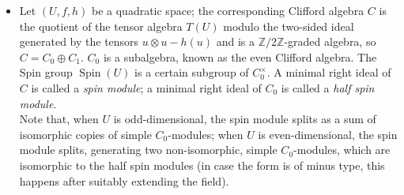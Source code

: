 \documentclass{amsart}
\numberwithin{equation}{section}
\theoremstyle{definition}
\theoremstyle{subresult}
\theoremstyle{caseresult}
\newcommand{\bF}{\mathbb{F}}
\newcommand{\bZ}{\mathbb{Z}}
\newcommand{\Aut}{\operatorname{Aut}}
\newcommand{\Sym}{\operatorname{Sym}}
\newcommand{\Spin}{\operatorname{Spin}}
\newcommand{\<}{\langle}
\renewcommand{\>}{\rangle}
\begin{document}
\begin{itemize}
		\item Let $(U,f,h)$ be a quadratic space; the corresponding Clifford algebra $C$ is the quotient of the tensor algebra $T(U)$ modulo the two-sided ideal generated by the tensors $u \otimes u - h(u)$ and is a $\bZ / 2\bZ$-graded algebra, so $C = C_0 \oplus C_1$. $C_0$ is a subalgebra, known as the even Clifford algebra. The Spin group $\Spin(U)$ is a certain subgroup of $C_0^\times$. A minimal right ideal of $C$ is called a \emph{spin module}; a minimal right ideal of $C_0$ is called a \emph{half spin module}.\\
		Note that, when $U$ is odd-dimensional, the spin module splits as a sum of isomorphic copies of simple $C_0$-modules; when $U$ is even-dimensional, the spin module splits, generating two non-isomorphic, simple $C_0$-modules, which are isomorphic to the half spin modules (in case the form is of minus type, this happens after suitably extending the field).

\end{itemize}
\end{document}
